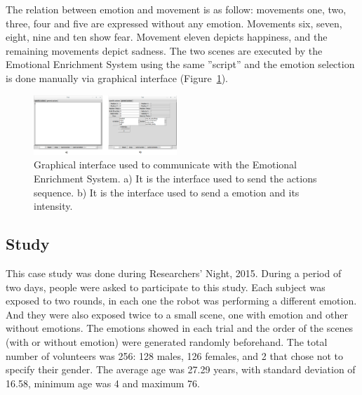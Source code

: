 The relation between emotion and movement is as follow: movements one, two, three, four and five are expressed without any emotion. Movements six, seven, eight, nine and ten show fear. Movement eleven depicts happiness, and the remaining movements depict sadness. The two scenes are executed by the Emotional Enrichment System using the same ''script'' and the emotion selection is done manually via graphical interface (Figure~\ref{fig:graphical_interface}).

\begin{figure}
	\centering
	\includegraphics[width=0.48\textwidth]{./Images/InterfaceExperiment.png} 
	\caption{Graphical interface used to communicate with the Emotional Enrichment System. a) It is the interface used to send the actions sequence. b) It is the interface used to send a emotion and its intensity.}
	\label{fig:graphical_interface}
\end{figure}

\subsection{Study}

This case study was done during Researchers' Night, 2015. During a period of two days, people were asked to participate to this study. Each subject was exposed to two rounds, in each one the robot was performing a different emotion. And  they were also exposed twice to a small scene, one with emotion and other without emotions. The emotions showed in each trial and the order of the scenes (with or without emotion) were generated randomly beforehand. The total number of volunteers was 256: 128 males, 126 females, and 2 that chose not to specify their gender. The average age was 27.29 years, with standard deviation of 16.58, minimum age was 4 and maximum 76.
